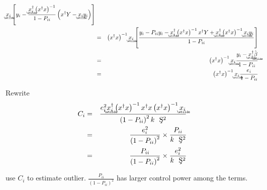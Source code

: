 \documentclass{article}
\begin{document}
\begin{eqnarray*}
\underaccent{\wtilde}{x}%
_{i}\left[ y_{i}-\frac{%
\underaccent{\wtilde}{x}%
_{i}^{\dagger }\left( x^{\dagger }x\right) ^{-1}}{1-P_{ii}}\left( x^{\dagger
}Y-%
\underaccent{\wtilde}{x}%
_{i}y_{i}\right) \right] \\
&=&\left( x^{\dagger }x\right) ^{-1}%
\underaccent{\wtilde}{x}%
_{i}\left[ \frac{y_{i}-P_{ii}y_{i}-%
\underaccent{\wtilde}{x}%
_{i}^{\dagger }\left( x^{\dagger }x\right) ^{-1}x^{\dagger }Y+%
\underaccent{\wtilde}{x}%
_{i}^{\dagger }\left( x^{\dagger }x\right) ^{-1}%
\underaccent{\wtilde}{x}%
_{i}y_{i}}{1-P_{ii}}\right] \\
&=&\left( x^{\dagger }x\right) ^{-1}%
\underaccent{\wtilde}{x}%
_{i}\frac{y_{i}-%
\underaccent{\wtilde}{x}%
_{i}^{\dagger }%
\underaccent{\wtilde}{\hat{\beta}}%
}{1-P_{ii}} \\
&=&\left( x^{\dagger }x\right) ^{-1}%
\underaccent{\wtilde}{x}%
_{i}\frac{e_{i}}{1-P_{ii}}
\end{eqnarray*}

\bigskip

Rewrite%
\begin{eqnarray*}
C_{i} &=&\frac{e_{i}^{2}%
\underaccent{\wtilde}{x}%
_{i}^{\dagger }\left( x^{\dagger }x\right) ^{-1}x^{\dagger }x\left(
x^{\dagger }x\right) ^{-1}%
\underaccent{\wtilde}{x}%
_{i}}{\left( 1-P_{ii}\right) ^{2}k\text{\c{S}}^{2}} \\
&=&\frac{e_{i}^{2}}{\left( 1-P_{ii}\right) ^{2}}\times \frac{P_{ii}}{k\text{%
\c{S}}^{2}} \\
&=&\frac{P_{ii}}{\left( 1-P_{ii}\right) ^{2}}\times \frac{e_{i}^{2}}{k\text{%
\c{S}}^{2}}
\end{eqnarray*}

\bigskip

use $C_{i}$ to estimate outlier. $\frac{P_{ii}}{\left( 1-P_{ii}\right) ^{2}}$
has larger control power among the terms.
\end{document}
